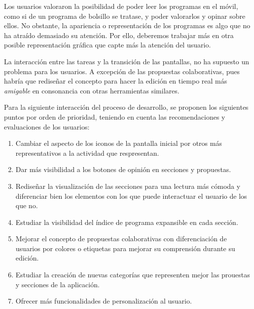 Los usuarios valoraron la posibilidad de poder leer los programas en el móvil, como si de un programa de bolsillo se tratase, y poder valorarlos y opinar sobre ellos. No obstante, la apariencia o representación de los programas es algo que no ha atraído demasiado su atención. Por ello, deberemos trabajar más en otra posible representación gráfica que capte más la atención del usuario.

La interacción entre las tareas y la transición de las pantallas, no ha supuesto un problema para los usuarios. A excepción de las propuestas colaborativas, pues habría que rediseñar el concepto para hacer la edición en tiempo real más \textit{amigable} en consonancia con otras herramientas similares.

Para la siguiente interacción del proceso de desarrollo, se proponen los siguientes puntos por orden de prioridad, teniendo en cuenta las recomendaciones y evaluaciones de los usuarios:

\begin{enumerate}
 \item Cambiar el aspecto de los iconos de la pantalla inicial por otros más representativos a la actividad que respresentan.
 \item Dar más visibilidad a los botones de opinión en secciones y propuestas.
 \item Rediseñar la visualización de las secciones para una lectura más cómoda y diferenciar bien los elementos con los que puede interactuar el usuario de los que no.
 \item Estudiar la visibilidad del índice de programa expansible en cada sección.
 \item Mejorar el concepto de propuestas colaborativas con diferenciación de usuarios por colores o etiquetas para mejorar su comprensión durante su edición.
 \item Estudiar la creación de nuevas categorías que representen mejor las prouestas y secciones de la aplicación.
 \item Ofrecer más funcionalidades de personalización al usuario.
\end{enumerate}
